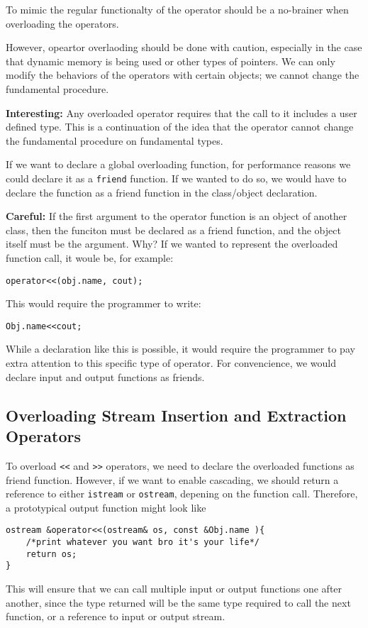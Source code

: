 \documentclass{article}
\begin{document}
To mimic the regular functionalty of the operator should be a no-brainer when overloading the operators.

However, opeartor overlaoding should be done with caution, especially in the case that dynamic memory is being 
used or other types of pointers. We can only modify the behaviors of the operators with certain objects;
we cannot change the fundamental procedure.

\textbf{Interesting:} Any overloaded operator requires that the call to it includes a user defined type. This 
is a continuation of the idea that the operator cannot change the fundamental procedure on fundamental types.

If we want to declare a global overloading function, for performance reasons we could declare it as a 
\texttt{friend} function. If we wanted to do so, we would have to declare the function as a friend 
function in the class/object declaration.

\textbf{Careful:} If the first argument to the operator function is an object of another class, then the funciton
must be declared as a friend function, and the object itself must be the argument. Why? If we wanted to represent
the overloaded function call, it woule be, for example:
\begin{verbatim}
operator<<(obj.name, cout);
\end{verbatim}
This would require the programmer to write:
\begin{verbatim}
Obj.name<<cout;
\end{verbatim}
While a declaration like this is possible, it would require the programmer to pay extra attention to this 
specific type of operator. For convencience, we would declare input and output functions as friends.
\subsection{Overloading Stream Insertion and Extraction Operators}
To overload \texttt{<<} and \texttt{>>} operators, we need to declare the overloaded functions as friend function.
However, if we want to enable cascading, we should return a reference to either \texttt{istream} or 
\texttt{ostream}, depening on the function call. Therefore, a prototypical output function might look like 
\begin{verbatim}
ostream &operator<<(ostream& os, const &Obj.name ){
	/*print whatever you want bro it's your life*/
	return os;
}
\end{verbatim}
This will ensure that we can call multiple input or output functions one after another, since the type returned
will be the same type required to call the next function, or a reference to input or output stream.
\end{document}
